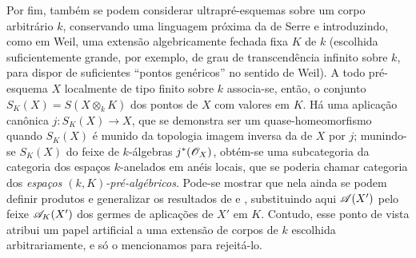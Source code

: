 \begin{env}[10.10.5]
\label{IV.10.10.5}
Por fim, também se podem considerar ultrapré-esquemas sobre um corpo arbitrário $k$, conservando uma linguagem próxima da de Serre e introduzindo, como em Weil, uma extensão algebricamente fechada fixa $K$ de $k$ (escolhida suficientemente grande, por exemplo, de grau de transcendência infinito sobre $k$, para dispor de suficientes ``pontos genéricos'' no sentido de Weil).
A todo pré-esquema $X$ localmente de tipo finito sobre $k$ associa-se, então, o conjunto $S_K(X)=S(X\otimes_kK)$ dos pontos de $X$ com valores em $K$.
Há uma aplicação canônica $j:S_K(X)\to X$, que se demonstra ser um quase-homeomorfismo quando $S_K(X)$ é munido da topologia imagem inversa da de $X$ por $j$; munindo-se $S_K(X)$ do feixe de $k$-álgebras $j^*(\mathscr{O}_X)$, obtém-se uma subcategoria da categoria dos espaços $k$-anelados em anéis locais, que se poderia chamar categoria dos \emph{espaços $(k,K)$-pré-algébricos}.
Pode-se mostrar que nela ainda se podem definir produtos e generalizar os resultados de  e , substituindo aqui $\mathscr{A}(X')$ pelo feixe $\mathscr{A}_K(X')$ dos germes de aplicações de $X'$ em $K$.
Contudo, esse ponto de vista atribui um papel artificial a uma extensão de corpos de $k$ escolhida arbitrariamente, e só o mencionamos para rejeitá-lo.
\end{env}
